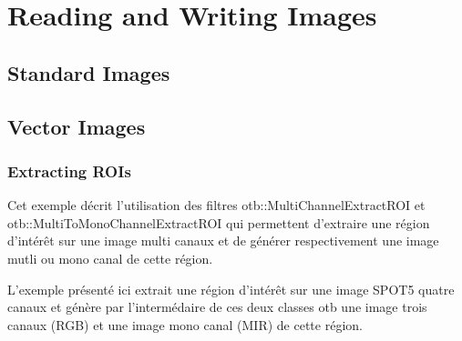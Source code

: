 \chapter{Reading and Writing Images}
\section{Standard Images}
\section{Vector Images}
\subsection{Extracting ROIs}
\label{sec:ExtractROI}

Cet exemple d\'ecrit l'utilisation des filtres otb::MultiChannelExtractROI et
otb::MultiToMonoChannelExtractROI qui permettent d'extraire une r\'egion d'int\'er\^et
sur une image multi canaux et de g\'en\'erer respectivement une image mutli ou 
mono canal de cette r\'egion.

L'exemple pr\'esent\'e ici extrait une r\'egion d'int\'er\^et sur une image SPOT5 
quatre canaux et g\'en\`ere par l'interm\'edaire de ces deux classes otb une image trois 
canaux (RGB) et une image mono canal (MIR) de cette r\'egion. 


\ifitkFullVersion

\fi
